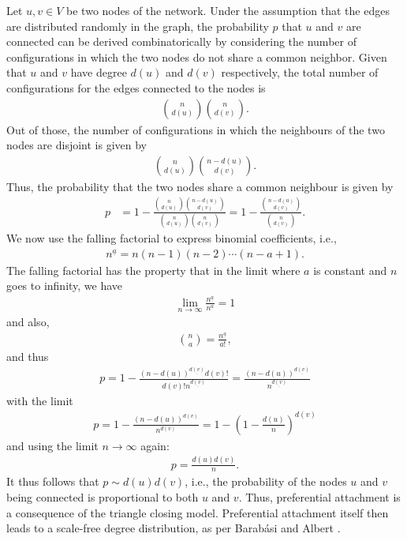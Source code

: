 \documentclass{jimis}
\begin{document}
Let $u,v \in V$ be two nodes of the network.  Under the assumption that
the edges are distributed randomly in the graph, the probability $p$
that $u$ and $v$ are connected can be derived combinatorically by
considering the number of configurations in which the two nodes do not
share a common neighbor.  Given that $u$ and $v$ have degree $d(u)$ and
$d(v)$ respectively, the total number of configurations for the edges
connected to the nodes is
\begin{align*}
  {{n} \choose {d(u)}} {{n} \choose {d(v)}}.
\end{align*}
Out of those, the number of configurations in which the neighbours of
the two nodes are disjoint is given by
\begin{align*}
  {{n} \choose {d(u)}} {{n - d(u)} \choose {d(v)}}.
\end{align*}
Thus, the probability that the two nodes share a common neighbour is
given by 
\begin{align*}
  p &= 1 - \frac
  {{{n} \choose {d(u)}} {{n - d(u)} \choose {d(v)}}}
  {{{n} \choose {d(u)}} {{n} \choose {d(v)}}}
  = 1 - \frac
  {{{n - d(u)} \choose {d(v)}}}
  {{{n} \choose {d(v)}}}.
\end{align*}
We now use the falling factorial to express binomial coefficients, i.e.,
\begin{align*}
  n^{\underline{a}} = n(n-1)(n-2)\cdots(n-a+1). 
\end{align*}
The falling factorial has the property that in the limit where $a$ is
constant and $n$ goes to infinity, we have
\begin{align*}
  \lim_{n \rightarrow \infty} \frac {n^{\underline{a}}}{n^a} = 1
\end{align*}
and also,
\begin{align*}
  {n \choose a} = \frac {n^{\underline{a}}} {a!}, 
\end{align*}
and thus
\begin{align*}
  p = 1 - \frac
  {(n - d(u))^{\underline{d(v)}} d(v)!}
  {d(v)! n^{\underline{d(v)}}} 
  = \frac
  {(n - d(u))^{\underline{d(v)}}}
  {n^{\underline{d(v)}}}
\end{align*}
with the limit
\begin{align*}
  p = 1 - \frac
  { (n - d(u))^{d(v)} }
  { n         ^{d(v)} }
  = 1 - \left( 1 - \frac {d(u)} {n} \right)^{d(v)}
\end{align*}
and using the limit $n \rightarrow \infty$ again:
\begin{align*}
  p = \frac {d(u)d(v)} {n}. 
\end{align*}
It thus follows that $p \sim d(u)d(v)$, i.e., the probability of the
nodes $u$ and $v$ being connected is proportional to both $u$ and $v$.
Thus, preferential attachment is a consequence of the triangle closing
model. 
Preferential attachment itself then leads to a scale-free degree
distribution, as per Barabási and Albert \citeyearpar{barabasi-albert}. 
\end{document}
